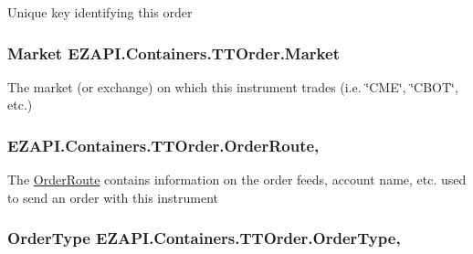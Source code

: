 Unique key identifying this order 

\hypertarget{class_e_z_a_p_i_1_1_containers_1_1_t_t_order_a5490863423d4aa1d048b4a52ff706338}{
\subsubsection[{Market}]{\setlength{\rightskip}{0pt plus 5cm}Market E\-Z\-A\-P\-I.\-Containers.\-T\-T\-Order.\-Market\hspace{0.3cm}{\ttfamily [get]}}}\label{class_e_z_a_p_i_1_1_containers_1_1_t_t_order_a5490863423d4aa1d048b4a52ff706338}


The market (or exchange) on which this instrument trades (i.\-e. \char`\"{}\-C\-M\-E\char`\"{}, \char`\"{}\-C\-B\-O\-T\char`\"{}, etc.) 

\hypertarget{class_e_z_a_p_i_1_1_containers_1_1_t_t_order_a5bde3e366d744617cc72e2502bc2a82a}{
\subsubsection[{Order\-Route}]{ E\-Z\-A\-P\-I.\-Containers.\-T\-T\-Order.\-Order\-Route\hspace{0.3cm}{\ttfamily [get]}, {\ttfamily [set]}}}\label{class_e_z_a_p_i_1_1_containers_1_1_t_t_order_a5bde3e366d744617cc72e2502bc2a82a}


The \hyperlink{class_e_z_a_p_i_1_1_containers_1_1_order_route}{Order\-Route} contains information on the order feeds, account name, etc. used to send an order with this instrument 

\hypertarget{class_e_z_a_p_i_1_1_containers_1_1_t_t_order_a20a9af1c0910044beea2eb31d6d633fa}{
\subsubsection[{Order\-Type}]{\setlength{\rightskip}{0pt plus 5cm}Order\-Type E\-Z\-A\-P\-I.\-Containers.\-T\-T\-Order.\-Order\-Type\hspace{0.3cm}{\ttfamily [get]}, {\ttfamily [set]}}}\label{class_e_z_a_p_i_1_1_containers_1_1_t_t_order_a20a9af1c0910044beea2eb31d6d633fa}


